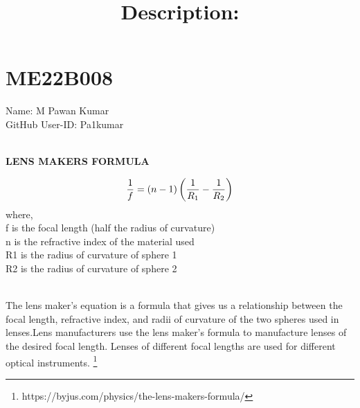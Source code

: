 
\section{ME22B008}
Name: M Pawan Kumar \\ GitHub User-ID: Pa1kumar \\ 
\\ \begin{center}
    \textbf{LENS MAKERS FORMULA}
\end{center}
\begin{equation*}
    \huge\frac{1}{f}=(n-1)\left(\frac{1}{R_1}-\frac{1}{R_2}\right)
\end{equation*}
where,\\
f is the focal length (half the radius of curvature)\\
n is the refractive index of the material used\\
R1 is the radius of curvature of sphere 1\\
R2 is the radius of curvature of sphere 2 \\ 
\title{\textbf{Description:}} \\
The lens maker’s equation is a formula that gives us a relationship between the focal length, refractive index, and radii of curvature of the two spheres used in lenses.Lens manufacturers use the lens maker’s formula to manufacture lenses of the desired focal length. Lenses of different focal lengths are used for different optical instruments.   
\footnote{https://byjus.com/physics/the-lens-makers-formula/}
